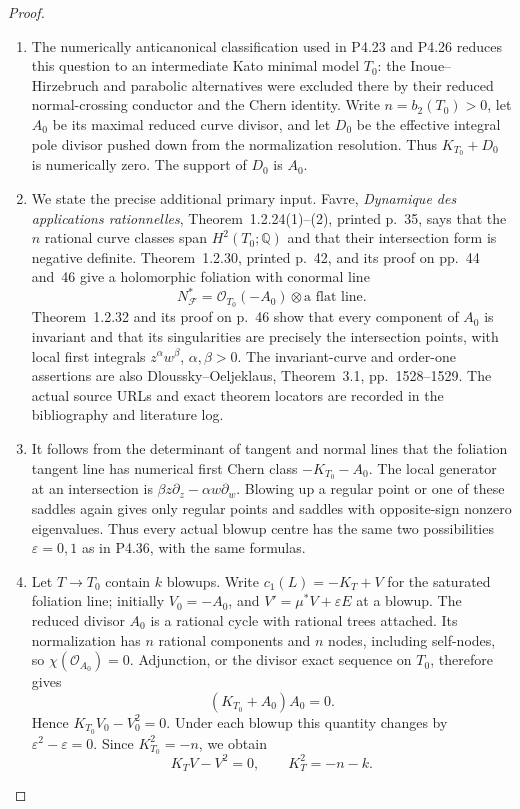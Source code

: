 \begin{proof}

\begin{enumerate}[label={$\langle1\rangle$\arabic*.},leftmargin=*]
\item The numerically anticanonical classification used in P4.23
and P4.26 reduces this question to an intermediate Kato
minimal model $T_0$: the Inoue--Hirzebruch and parabolic
alternatives were excluded there by their reduced
normal-crossing conductor and the Chern identity.
Write $n=b_2(T_0)>0$, let $A_0$ be its maximal reduced
curve divisor, and let $D_0$ be the effective integral
pole divisor pushed down from the normalization resolution.
Thus $K_{T_0}+D_0$ is numerically zero. The support of
$D_0$ is $A_0$.

\item We state the precise additional primary input.
Favre, \emph{Dynamique des applications rationnelles},
Theorem~1.2.24(1)--(2), printed p.~35, says that the
$n$ rational curve classes span $H^2(T_0;\mathbb Q)$
and that their intersection form is negative definite.
Theorem~1.2.30, printed p.~42, and its proof on
pp.~44 and~46 give a holomorphic foliation with conormal
line
\[
 N_{\mathcal F}^*=\mathcal O_{T_0}(-A_0)
                       \otimes\text{a flat line}.
\]
Theorem~1.2.32 and its proof on p.~46 show that every
component of $A_0$ is invariant and that its singularities
are precisely the intersection points, with local
first integrals $z^\alpha w^\beta$, $\alpha,\beta>0$.
The invariant-curve and order-one assertions are also
Dloussky--Oeljeklaus, Theorem~3.1, pp.~1528--1529.
The actual source URLs and exact theorem locators are
recorded in the bibliography and literature log.

\item It follows from the determinant of tangent and normal
lines that the foliation tangent line has numerical
first Chern class $-K_{T_0}-A_0$. The local generator
at an intersection is
$\beta z\partial_z-\alpha w\partial_w$.
Blowing up a regular point or one of these saddles
again gives only regular points and saddles with
opposite-sign nonzero eigenvalues. Thus every actual
blowup centre has the same two possibilities
$\varepsilon=0,1$ as in P4.36, with the same formulas.

\item Let $T\to T_0$ contain $k$ blowups. Write
$c_1(L)=-K_T+V$ for the saturated foliation line;
initially $V_0=-A_0$, and
$V'=\mu^*V+\varepsilon E$ at a blowup.
The reduced divisor $A_0$ is a rational cycle with
rational trees attached. Its normalization has
$n$ rational components and $n$ nodes, including
self-nodes, so $\chi(\mathcal O_{A_0})=0$.
Adjunction, or the divisor exact sequence on $T_0$,
therefore gives
\[
 (K_{T_0}+A_0)A_0=0.
\]
Hence $K_{T_0}V_0-V_0^2=0$.
Under each blowup this quantity changes by
$\varepsilon^2-\varepsilon=0$.
Since $K_{T_0}^2=-n$, we obtain
\[
 K_TV-V^2=0,\qquad K_T^2=-n-k.
\]


\end{enumerate}
\end{proof}
